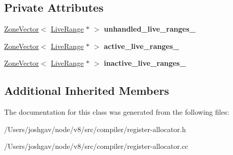 \subsection*{Private Attributes}
\begin{DoxyCompactItemize}
\item 
\hyperlink{classv8_1_1internal_1_1_zone_vector}{Zone\+Vector}$<$ \hyperlink{classv8_1_1internal_1_1compiler_1_1_live_range}{Live\+Range} $\ast$ $>$ {\bfseries unhandled\+\_\+live\+\_\+ranges\+\_\+}\hypertarget{classv8_1_1internal_1_1compiler_1_1_linear_scan_allocator_a30a79f690a1d44f567f5d3144113f0f7}{}\label{classv8_1_1internal_1_1compiler_1_1_linear_scan_allocator_a30a79f690a1d44f567f5d3144113f0f7}

\item 
\hyperlink{classv8_1_1internal_1_1_zone_vector}{Zone\+Vector}$<$ \hyperlink{classv8_1_1internal_1_1compiler_1_1_live_range}{Live\+Range} $\ast$ $>$ {\bfseries active\+\_\+live\+\_\+ranges\+\_\+}\hypertarget{classv8_1_1internal_1_1compiler_1_1_linear_scan_allocator_a4716296408d20bbb14ec7432e85cff13}{}\label{classv8_1_1internal_1_1compiler_1_1_linear_scan_allocator_a4716296408d20bbb14ec7432e85cff13}

\item 
\hyperlink{classv8_1_1internal_1_1_zone_vector}{Zone\+Vector}$<$ \hyperlink{classv8_1_1internal_1_1compiler_1_1_live_range}{Live\+Range} $\ast$ $>$ {\bfseries inactive\+\_\+live\+\_\+ranges\+\_\+}\hypertarget{classv8_1_1internal_1_1compiler_1_1_linear_scan_allocator_a6b4b42a7aaf9df27ea8e71ed63110d9a}{}\label{classv8_1_1internal_1_1compiler_1_1_linear_scan_allocator_a6b4b42a7aaf9df27ea8e71ed63110d9a}

\end{DoxyCompactItemize}
\subsection*{Additional Inherited Members}


The documentation for this class was generated from the following files\+:\begin{DoxyCompactItemize}
\item 
/\+Users/joshgav/node/v8/src/compiler/register-\/allocator.\+h\item 
/\+Users/joshgav/node/v8/src/compiler/register-\/allocator.\+cc\end{DoxyCompactItemize}
